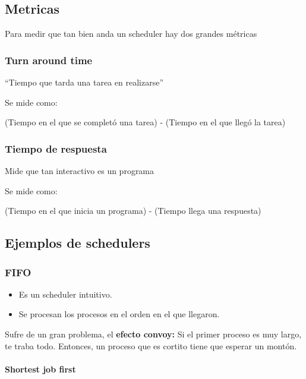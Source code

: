 \documentclass{article}
\begin{document}
\subsection{Metricas}\label{metricas}

Para medir que tan bien anda un scheduler hay dos grandes métricas

\subsubsection{Turn around time}\label{turn-around-time}

``Tiempo que tarda una tarea en realizarse''

Se mide como:

(Tiempo en el que se completó una tarea) - (Tiempo en el que llegó la
tarea)

\subsubsection{Tiempo de respuesta}\label{tiempo-de-respuesta}

Mide que tan interactivo es un programa

Se mide como:

(Tiempo en el que inicia un programa) - (Tiempo llega una respuesta)

\subsection{Ejemplos de schedulers}\label{ejemplos-de-schedulers}

\subsubsection{FIFO}\label{fifo}

\begin{itemize}
\item
  Es un scheduler intuitivo.
\item
  Se procesan los procesos en el orden en el que llegaron.
\end{itemize}

Sufre de un gran problema, el \textbf{efecto convoy:} Si el primer
proceso es muy largo, te traba todo. Entonces, un proceso que es cortito
tiene que esperar un montón.

\paragraph{Shortest job first}\label{shortest-job-first}
\end{document}
